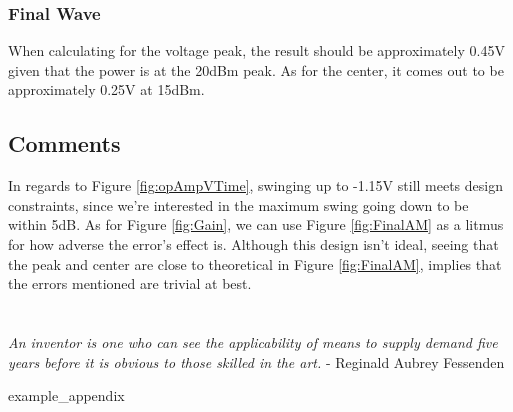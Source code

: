 \documentclass{article}
\begin{document}
    \subsubsection{Final Wave}
    When calculating for the voltage peak, the result should be approximately 0.45V given that the power is at the 20dBm peak. As for the center, it comes out to be approximately 0.25V at 15dBm.
    
\subsection{Comments}
In regards to Figure \ref{fig:opAmpVTime}, swinging up to -1.15V still meets design constraints, since we're interested in the maximum swing going down to be within 5dB. As for Figure \ref{fig:Gain}, we can use Figure \ref{fig:FinalAM} as a litmus for how adverse the error's effect is. Although this design isn't ideal, seeing that the peak and center are close to theoretical in Figure \ref{fig:FinalAM}, implies that the errors mentioned are trivial at best.
\\
\\
\\
\textit{An inventor is one who can see the applicability of means to supply demand five years before it is obvious to those skilled in the art. } -  Reginald Aubrey Fessenden

\nocite{*} 
\newpage
\printbibliography[heading = bibintoc, title = Bibliography]    %

\addappendix
{example_appendix}

\end{document}

